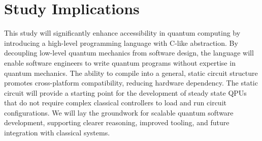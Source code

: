 \documentclass[journal,onecolumn, compsoc]{IEEEtran}
\begin{document}
\section{Study Implications}
This study will significantly enhance accessibility in quantum computing by introducing a high-level programming language with C-like abstraction. 
By decoupling low-level quantum mechanics from software design, the language will enable software engineers to write quantum programs without expertise in quantum mechanics. 
The ability to compile into a general, static circuit structure promotes cross-platform compatibility, reducing hardware dependency. 
The static circuit will provide a starting point for the development of steady state QPUs that do not require complex classical controllers to load and run circuit configurations.
We will lay the groundwork for scalable quantum software development, supporting clearer reasoning, improved tooling, and future integration with classical systems. 



\end{document}
